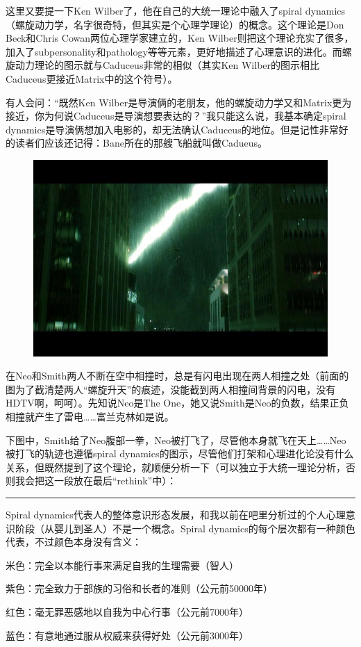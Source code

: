 \documentclass[UTF8]{ctexart}
\newcommand{\myparsep}{\noindent \rule[0.5ex]{\linewidth}{1pt}}
\begin{document}
这里又要提一下Ken Wilber了，他在自己的大统一理论中融入了spiral dynamics（螺旋动力学，名字很奇特，但其实是个心理学理论）的概念。这个理论是Don Beck和Chris Cowan两位心理学家建立的，Ken Wilber则把这个理论充实了很多，加入了subpersonality和pathology等等元素，更好地描述了心理意识的进化。而螺旋动力理论的图示就与Caduceus非常的相似（其实Ken Wilber的图示相比Caduceus更接近Matrix中的这个符号）。

有人会问：“既然Ken Wilber是导演俩的老朋友，他的螺旋动力学又和Matrix更为接近，你为何说Caduceus是导演想要表达的？”我只能这么说，我基本确定spiral dynamics是导演俩想加入电影的，却无法确认Caduceus的地位。但是记性非常好的读者们应该还记得：Bane所在的那艘飞船就叫做Cadueus。

\begin{figure}[htb]
\centering
\includegraphics[width=0.5\linewidth]{fig/f05a0dd75b9283dea044df73.jpg}
\end{figure}

在Neo和Smith两人不断在空中相撞时，总是有闪电出现在两人相撞之处（前面的图为了截清楚两人“螺旋升天”的痕迹，没能截到两人相撞间背景的闪电，没有HDTV啊，呵呵）。先知说Neo是The One，她又说Smith是Neo的负数，结果正负相撞就产生了雷电……富兰克林如是说。

下图中，Smith给了Neo腹部一拳，Neo被打飞了，尽管他本身就飞在天上……Neo被打飞的轨迹也遵循spiral dynamics的图示，尽管他们打架和心理进化论没有什么关系，但既然提到了这个理论，就顺便分析一下（可以独立于大统一理论分析，否则我会把这一段放在最后“rethink”中）：

\myparsep

Spiral dynamics代表人的整体意识形态发展，和我以前在吧里分析过的个人心理意识阶段（从婴儿到圣人）不是一个概念。Spiral dynamics的每个层次都有一种颜色代表，不过颜色本身没有含义：

米色：完全以本能行事来满足自我的生理需要（智人）

紫色：完全致力于部族的习俗和长者的准则（公元前50000年）

红色：毫无罪恶感地以自我为中心行事（公元前7000年）

蓝色：有意地通过服从权威来获得好处（公元前3000年）
\end{document}
